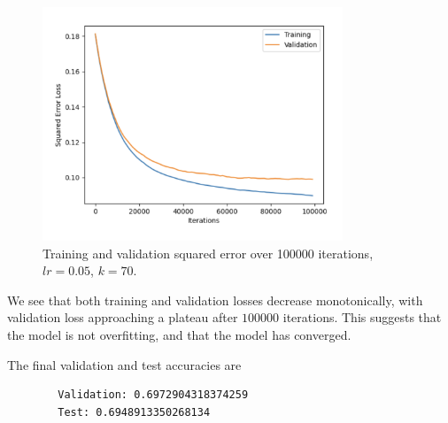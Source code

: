 \documentclass{article}
\begin{document}
\begin{enumerate}[(a)]
    \begin{figure}[H]
        \centering
        \includegraphics[width=0.8\textwidth]{q3e.png}
        \caption{Training and validation squared error over 100000 iterations, $lr = 0.05$, $k = 70$.}
        \label{fig:loss}
    \end{figure}

    We see that both training and validation losses decrease monotonically, with validation loss approaching a plateau after $100000$ iterations. This suggests that the model is not overfitting, and that the model has converged.
    
    
    The final validation and test accuracies are

    \begin{verbatim}
        Validation: 0.6972904318374259
        Test: 0.6948913350268134
    \end{verbatim}

\end{enumerate}
\end{document}
